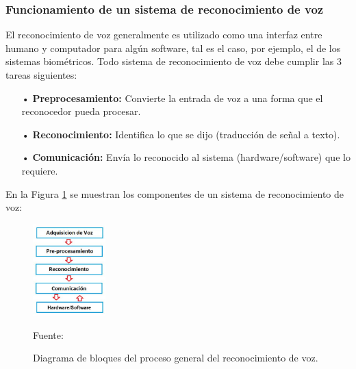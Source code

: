 \subsubsection{Funcionamiento de un sistema de reconocimiento de voz}
El reconocimiento de voz generalmente es utilizado como una interfaz entre humano y computador para algún software, tal es el caso, por ejemplo, el de los sistemas biométricos. Todo sistema de reconocimiento de voz debe cumplir las 3 tareas siguientes:

\begin{enumerate}
\item[•]\textbf{Preprocesamiento:} Convierte la entrada de voz a una forma que el reconocedor pueda procesar.
\item[•]\textbf{Reconocimiento:} Identifica lo que se dijo (traducción de señal a texto).
\item[•]\textbf{Comunicación:} Envía lo reconocido al sistema (hardware/software) que lo requiere.
\end{enumerate}

En la Figura \ref{fig:figura2.4} se muestran los componentes de un sistema de reconocimiento de voz:

\begin{figure}[ht]
\begin{center}
\includegraphics[width=0.25\textwidth]{Imagenes/Cap2/image004}
\end{center}
\begin{center}
\vskip -0.5cm
\caption{\small{Diagrama de bloques del proceso general del reconocimiento de voz.}}
\label{fig:figura2.4}
{\small{Fuente: \cite{rama}}}
\end{center}
\end{figure}

